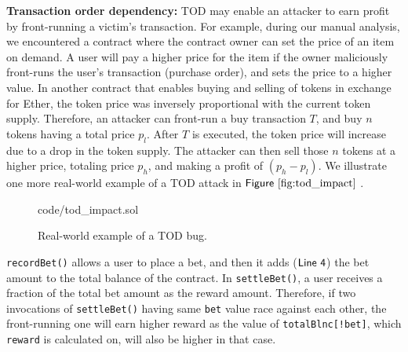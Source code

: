 \documentclass[conference, romanappendices]{tex/IEEEtran}
\theoremstyle{bfnote}
\newcommand{\ether}{{Ether}\xspace}
\newcommand{\Line}[1]{\ensuremath{\sf Line~ #1}}
\newcommand{\Fig}[1]{\ensuremath{\sf Figure~\ref{#1}}}
\begin{document}
\noindent
\textbf{Transaction order dependency:} TOD may enable an attacker to earn profit by front-running a victim's transaction.
For example, during our manual analysis, we encountered a contract where the contract owner can set the price of an item on demand.
A user will pay a higher price for the item if the owner maliciously front-runs the user's transaction (purchase order), and sets the price to a higher value.
In another contract that enables buying and selling of tokens in exchange for \ether, the token price was inversely proportional with the current token supply.
Therefore, an attacker can front-run a buy transaction $T$, and buy $n$ tokens having a total price $p_l$.
After $T$ is executed, the token price will increase due to a drop in the token supply.
The attacker can then sell those $n$ tokens at a higher price, totaling price $p_h$, and making a profit of $(p_h - p_l)$.
We illustrate one more real-world example of a TOD attack in \Fig{fig:tod_impact} .
\begin{figure}[h]
	\vspace{-5mm}
	
	{code/tod_impact.sol}
	\vspace{-0.22in}
	\caption{Real-world example of a TOD bug.
	}
	\label{fig:tod_impact}
	\vspace{-0.1in}
\end{figure}
\texttt{recordBet()} allows a user to place a bet, and then it adds (\Line{4}) the bet amount to the total balance of the contract.
In \texttt{settleBet()}, a user receives a fraction of the total bet amount as the reward amount.
Therefore, if two invocations of \texttt{settleBet()} having same \texttt{bet} value race against each other, the front-running one will earn higher reward as the value of \texttt{totalBlnc[!bet]}, which \texttt{reward} is calculated on, will also be higher in that case.
\end{document}
